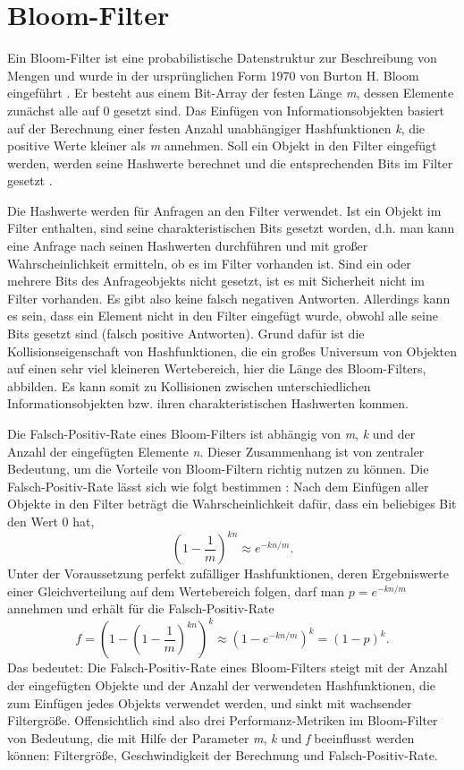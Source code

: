 \section{Bloom-Filter}\label{sec:bloom}
Ein Bloom-Filter ist eine probabilistische Datenstruktur zur Beschreibung von Mengen und wurde in der ursprünglichen Form 1970 von Burton H. Bloom eingeführt \cite{Bloom1970}. Er besteht aus einem Bit-Array der festen Länge \textit{m}, dessen Elemente zunächst alle auf 0 gesetzt sind. Das Einfügen von Informationsobjekten basiert auf der Berechnung einer festen Anzahl unabhängiger Hashfunktionen \textit{k}, die positive Werte kleiner als \textit{m} annehmen. Soll ein Objekt in den Filter eingefügt werden, werden seine Hashwerte berechnet und die entsprechenden Bits im Filter gesetzt \cite{Broder2004}. 

Die Hashwerte werden für Anfragen an den Filter verwendet. Ist ein Objekt im Filter enthalten, sind seine charakteristischen Bits gesetzt worden, d.h. man kann eine Anfrage nach seinen Hashwerten durchführen und mit großer Wahrscheinlichkeit ermitteln, ob es im Filter vorhanden ist. Sind ein oder mehrere Bits des Anfrageobjekts nicht gesetzt, ist es mit Sicherheit nicht im Filter vorhanden. Es gibt also keine falsch negativen Antworten. Allerdings kann es sein, dass ein Element nicht in den Filter eingefügt wurde, obwohl alle seine Bits gesetzt sind (falsch positive Antworten). Grund dafür ist die Kollisionseigenschaft von Hashfunktionen, die ein großes Universum von Objekten auf einen sehr viel kleineren Wertebereich, hier die Länge des Bloom-Filters, abbilden. Es kann somit zu Kollisionen zwischen unterschiedlichen Informationsobjekten bzw. ihren charakteristischen Hashwerten kommen. 

Die Falsch-Positiv-Rate eines Bloom-Filters ist abhängig von \textit{m}, \textit{k} und der Anzahl der eingefügten Elemente \textit{n}. Dieser Zusammenhang ist von zentraler Bedeutung, um die Vorteile von Bloom-Filtern richtig nutzen zu können. Die Falsch-Positiv-Rate lässt sich wie folgt bestimmen \cite{Broder2004}: Nach dem Einfügen aller Objekte in den Filter beträgt die Wahrscheinlichkeit dafür, dass ein beliebiges Bit den Wert 0 hat, 
\[\left(1 - \frac{1}{m}\right)^{kn}\approx e^{-kn/m}.\]
Unter der Voraussetzung perfekt zufälliger Hashfunktionen, deren Ergebniswerte einer Gleichverteilung auf dem Wertebereich folgen, darf man $p = e^{-kn/m}$ annehmen und erhält für die Falsch-Positiv-Rate
\[f = \left(1 - \left(1-\frac{1}{m}\right)^{kn}\right)^k\approx\left(1 - e^{-kn/m}\right)^k = (1-p)^k.\]
\noindent
Das bedeutet: Die Falsch-Positiv-Rate eines Bloom-Filters steigt mit der Anzahl der eingefügten Objekte und der Anzahl der verwendeten Hashfunktionen, die zum Einfügen jedes Objekts verwendet werden, und sinkt mit wachsender Filtergröße. Offensichtlich sind also drei Performanz-Metriken im Bloom-Filter von Bedeutung, die mit Hilfe der Parameter \textit{m}, \textit{k} und \textit{f} beeinflusst werden können: Filtergröße, Geschwindigkeit der Berechnung und Falsch-Positiv-Rate.  


